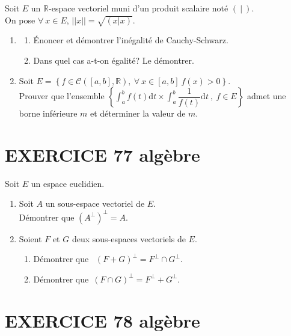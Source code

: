 \documentclass[10pt,oneside]{article}
\begin{document}
\begin{flushleft}
Soit $E$ un $\mathbb{R}$-espace vectoriel muni  d'un produit scalaire noté $(\:|\:)$.\\
On pose $\forall\:x\in E$, $||x||=\sqrt{(x|x)}$.
\begin{enumerate}
\item 
\begin{enumerate}
\item 
\'Enoncer et d\'{e}montrer l'in\'{e}galit\'{e} de Cauchy-Schwarz.



\item
Dans quel cas a-t-on égalité? Le démontrer.
\end{enumerate}
\item

Soit $E=\left\lbrace f\in\mathcal{C}\left( \left[ a,b\right] ,\mathbb{R}\right) ,\:\forall\:x\in \left[ a,b\right]\:f(x)>0  \right\rbrace$. \\
Prouver que l'ensemble   $ \left\lbrace \displaystyle\int_{a}^{b}f(t)\mathrm{d}t\times \displaystyle\int_{a}^{b}\dfrac{1}{f(t)}\mathrm{d}t\:,\:f\in E\right\rbrace $ admet une borne inférieure $m$ et déterminer la valeur de $m$.
\end{enumerate}

\section*{EXERCICE 77 \: algèbre }


Soit $E$ un espace euclidien.

\begin{enumerate}


\item 
 Soit $A$ un sous-espace vectoriel de $E$.\\
D\'{e}montrer que $\left( A^{\perp }\right) ^{\perp }=A$.
\item
Soient  $F$ et $G$ deux sous-espaces vectoriels de $E$.
\begin{enumerate}

\item

D\'{e}montrer que \ $\left( F+G\right) ^{\perp }=F^{\perp }\cap G^{\perp }$.

\item D\'{e}montrer que\ $\left( F\cap G\right) ^{\perp }=F^{\perp}+G^{\perp }$.
\end{enumerate}
\end{enumerate}		



\section*{EXERCICE 78 \: algèbre  }


\end{flushleft}
\end{document}
